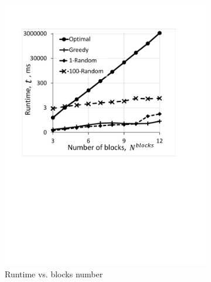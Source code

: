 \begin{figure}
    \centering
    \begin{subfigure}{0.38\textwidth}
        \includegraphics[width=\linewidth]{figs/RuntimeVsBlocks.pdf}
        \caption{Runtime vs. blocks number}
        \label{fig:RuntimeVsBlocks}
    \end{subfigure}
    \hspace{12mm}
    \begin{subfigure}{0.42\textwidth}

\end{subfigure}
\end{figure}
